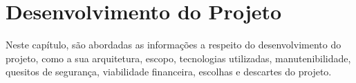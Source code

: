 \chapter{Desenvolvimento do Projeto}
Neste capítulo, são abordadas as informações a respeito do desenvolvimento do projeto, como a sua arquitetura, escopo, tecnologias utilizadas, manutenibilidade, quesitos de segurança, viabilidade financeira, escolhas e descartes do projeto.



















